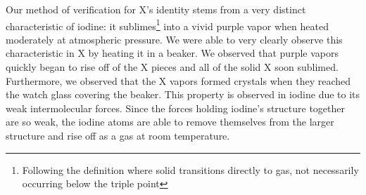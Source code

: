 \documentclass[titlepage]{article}
\begin{document}
Our method of verification for X's identity stems from a very distinct characteristic of iodine: it sublimes\footnote{Following the definition where solid transitions directly to gas, not necessarily occurring below the triple point} into a vivid purple vapor when heated moderately at atmospheric pressure. We were able to very clearly observe this characteristic in X by heating it in a beaker. We observed that purple vapors quickly began to rise off of the X pieces and all of the solid X soon sublimed. Furthermore, we observed that the X vapors formed crystals when they reached the watch glass covering the beaker. This property is observed in iodine due to its weak intermolecular forces. Since the forces holding iodine's structure together are so weak, the iodine atoms are able to remove themselves from the larger structure and rise off as a gas at room temperature. 




% 
% 
% 
\end{document}
